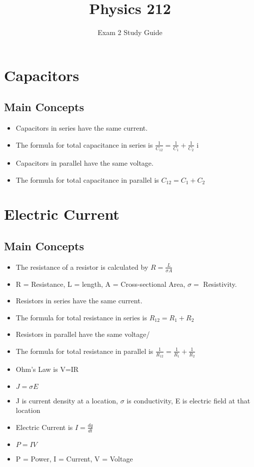 \documentclass{article}
\title{Physics 212}
\date{\vspace{-5ex}}
\author{Exam 2 Study Guide}
\begin{document}
\maketitle
\section{Capacitors}
\subsection{Main Concepts}
\begin{itemize}
	\item Capacitors in series have the same current. 
	\item The formula for total capacitance in series is $\frac{1}{C_{12}} =\frac{1}{C_1} + \frac{1}{C_2}$  
	i\item Capacitors in parallel have the same voltage.
\item The formula for total capacitance in parallel is $C_{12} = C_1 + C_2$

\end{itemize}
\section{Electric Current}
\subsection{Main Concepts}
\begin{itemize}
		\item The resistance of a resistor is calculated by $R=\frac{L}{\sigma A}$
		\item R = Resistance, L = length, A = Cross-sectional Area, $\sigma =$ Resistivity.
		\item Resistors in series have the same current.
		\item The formula for total resistance in series is $R_{12} = R_1 + R_2$
		\item Resistors in parallel have the same voltage/
		\item The formula for total resistance in parallel is $\frac{1}{R_{12}} = \frac{1}{R_1} + \frac{1}{R_2}$
		\item Ohm's Law is V=IR
		\item $J = \sigma E$
		\item J is current density at a location, $\sigma$ is conductivity, E is electric field at that location
		\item Electric Current is $ I = \frac{dq}{dt}$
		\item $ P = IV$
		\item P = Power, I = Current, V = Voltage
\end{itemize}
\end{document}
